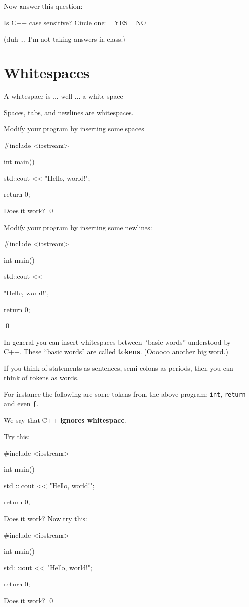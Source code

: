 Now answer this question:

Is C++ case sensitive? Circle one: \,\,\, YES  \,\,\, NO

(duh ... I'm not taking answers in class.)






\newpage\section{Whitespaces}

A whitespace is ... well ... a white space.

Spaces, tabs, and newlines are whitespaces.


\begin{ex}
Modify your program by inserting some spaces:
\begin{console}
#include <iostream>

int main()
{
    std::cout            << "Hello, world!\n";

    return 0;
}
\end{console}
Does it work?
\qed
\end{ex}

\begin{ex}
Modify your program by inserting some newlines:
\begin{console}
#include <iostream>

int main()
{
    std::cout << 




            "Hello, world!\n";

    return 0;
}
\end{console}
\qed
\end{ex}



In general you can insert whitespaces between 
\lq\lq basic words'' understood by C++. 
These \lq\lq basic words'' are called \textbf{tokens}. 
(Oooooo another big word.)

If you think of statements as sentences, 
semi-colons as periods, then you can think of tokens as words.


For instance the following are some tokens from the above program: 
\texttt{int}, \texttt{return} and even \texttt{\{}.

We say that C++ \textbf{ignores whitespace}. 


\begin{ex}
Try this:
\begin{console}
#include <iostream>

int main()
{
    std :: cout << "Hello, world!\n";

    return 0;
}
\end{console}
Does it work?
Now try this:
\begin{console}
#include <iostream>

int main()
{
    std:     :cout << "Hello, world!\n";

    return 0;
}
\end{console}
Does it work?
\qed
\end{ex}



